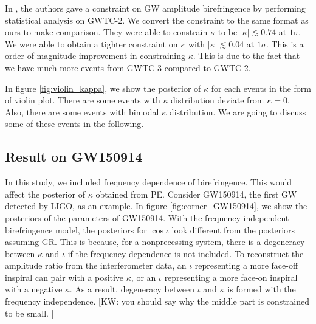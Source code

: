 \documentclass[aps,prd,twocolumn,superscriptaddress,preprintnumbers,floatfix,nofootinbib]{revtex4-2}
\newcommand{\kw}[1]{{\color{rb4}[KW: #1 ]}}
\begin{document}
In \citet{Okounkova_2022}, the authors gave a constraint on GW amplitude birefringence by performing statistical analysis on GWTC-2.
We convert the constraint to the same format as ours to make comparison.
They were able to constrain $\kappa$ to be $|\kappa| \lesssim 0.74$ at $1 \sigma$.
We were able to obtain a tighter constraint on $\kappa$ with $|\kappa| \lesssim 0.04$ at $1 \sigma$.
This is a order of magnitude improvement in constraining $\kappa$.
This is due to the fact that we have much more events from GWTC-3 compared to GWTC-2.

In figure \ref{fig:violin_kappa}, we show the posterior of $\kappa$ for each events in the form of violin plot.
There are some events with $\kappa$ distribution deviate from $\kappa=0$.
Also, there are some events with bimodal $\kappa$ distribution.
We are going to discuss some of these events in the following.





\subsection{Result on GW150914}
In this study, we included frequency dependence of birefringence.
This would affect the posterior of $\kappa$ obtained from PE.
Consider GW150914, the first GW detected by LIGO, as an example.
In figure \ref{fig:corner_GW150914}, we show the posteriors of the parameters of GW150914.
With the frequency independent birefringence model, the posteriors for $\cos\iota$ look different from the posteriors assuming GR.
This is because, for a nonprecessing system, there is a degeneracy between $\kappa$ and $\iota$ if the frequency dependence is not included.
To reconstruct the amplitude ratio from the interferometer data, an $\iota$ representing a more face-off inspiral can pair with a positive $\kappa$, or an $\iota$ representing a more face-on inspiral with a negative $\kappa$.
As a result, degeneracy between $\iota$ and $\kappa$ is formed with the frequency independence.
\kw{you should say why the middle part is constrained to be small.}
\end{document}
